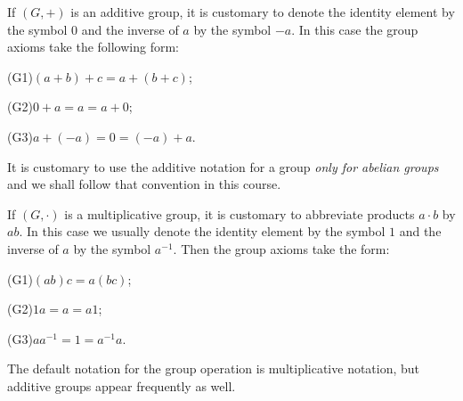 \documentclass[11pt]{article}
\theoremstyle{definition}
\begin{document}
If $(G,+)$ is an additive group, it is customary to denote the
identity element by the symbol $0$ and the inverse of $a$ by the
symbol $-a$.  In this case the group axioms take the following form:

(G1)\quad $(a+b)+c = a+(b+c)$; 

(G2)\quad $0+a=a=a+0$; 

(G3)\quad $a+(-a) = 0 = (-a)+a$.

\noindent
It is customary to use the additive notation for a group {\em only for
  abelian groups} and we shall follow that convention in this course.

If $(G, \cdot)$ is a multiplicative group, it is customary to
abbreviate products $a \cdot b$ by $ab$. In this case we usually
denote the identity element by the symbol $1$ and the inverse of $a$
by the symbol $a^{-1}$. Then the group axioms take the form:

(G1)\quad $(ab)c = a(bc)$; 

(G2)\quad $1a=a=a1$; 

(G3)\quad $aa^{-1} = 1 = a^{-1}a$.

The default notation for the group operation is multiplicative
notation, but additive groups appear frequently as well.
\end{document}
